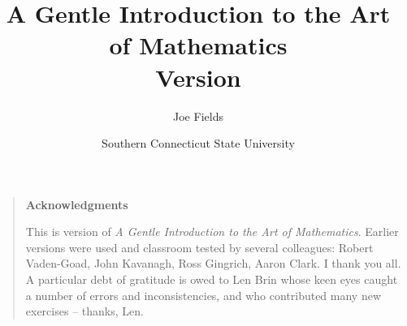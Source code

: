 \documentclass[dvips,12pt,twoside]{book}
\begin{document}
\frontmatter

\title{A Gentle Introduction to the Art of Mathematics\\ {\small Version \versionNum {} }}
\author{Joe Fields}
\date{Southern Connecticut State University}

\maketitle

\clearpage



\clearpage

\rule{0pt}{0pt}

\vfill

\begin{quote}
{\Large \bf Acknowledgments} 

   This is version \versionNum of {\em A Gentle Introduction to the Art of Mathematics}.
Earlier versions were used and classroom tested by several colleagues: 
Robert Vaden-Goad, John Kavanagh, Ross Gingrich, Aaron Clark.  I thank you all.  
A particular debt of gratitude is owed to Len Brin whose keen eyes caught 
a number of errors and inconsistencies, and who contributed many new 
exercises -- thanks, Len. 
  
\end{quote}

\vfill


\clearpage

\tableofcontents

\listoffigures

\listoftables

%
%

\mainmatter













{}%


%

{}
\printindex
\end{document}
